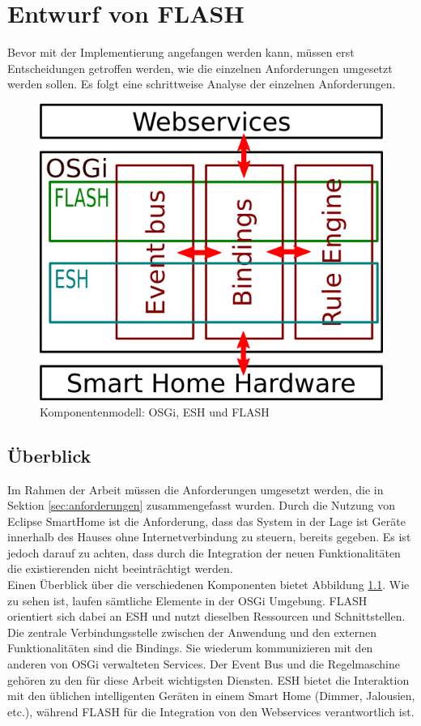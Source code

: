 \chapter{Entwurf von FLASH}
\label{chap:entwurf}
Bevor mit der Implementierung angefangen werden kann, müssen erst Entscheidungen
getroffen werden, wie die einzelnen Anforderungen umgesetzt werden sollen. Es folgt eine
schrittweise Analyse der einzelnen Anforderungen.


\begin{figure}[h]
	\centering
	\includegraphics{bilder/entwurf_comp}
	\caption{Komponentenmodell: OSGi, ESH und FLASH}
	\label{fig:comp}
\end{figure}


\section{Überblick}
Im Rahmen der Arbeit müssen die Anforderungen umgesetzt werden, die in Sektion \ref{sec:anforderungen} zusammengefasst wurden. Durch die Nutzung von Eclipse SmartHome ist die Anforderung, dass das System in der Lage ist Geräte innerhalb des Hauses ohne Internetverbindung zu steuern, bereits gegeben. Es ist jedoch darauf zu achten, dass durch die Integration der neuen Funktionalitäten die existierenden nicht beeinträchtigt werden.\\

Einen Überblick über die verschiedenen Komponenten bietet Abbildung \ref{fig:comp}. Wie zu sehen ist, laufen sämtliche Elemente in der OSGi Umgebung. FLASH orientiert sich dabei an ESH und nutzt dieselben Ressourcen und Schnittstellen. Die zentrale Verbindungsstelle zwischen der Anwendung und den externen Funktionalitäten sind die Bindings. Sie wiederum kommunizieren mit den anderen von OSGi verwalteten Services. Der Event Bus und die Regelmaschine gehören zu den für diese Arbeit wichtigsten Diensten. ESH bietet die Interaktion mit den üblichen intelligenten Geräten in einem Smart Home (Dimmer, Jalousien, etc.), während FLASH für die Integration von den Webservices verantwortlich ist.\\


